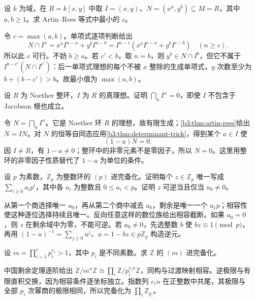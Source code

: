 \begin{exercise}\label{b3:ex:13-artin-rees-number}
	设 \(k\) 为域，在 \(R=k[x,y]\) 中取 \(I=(x,y)\)、\(N=(x^a,y^b)\subseteq M=R\)，其中 \(a,b\ge1\)。求 Artin–Rees 等式中最小的 \(c\)。
\end{exercise}
\begin{solution}
	令 \(c=\max(a,b)\)。单项式逐项判断给出
	\[
		N\cap I^n=x^aI^{n-a}+y^bI^{n-b} =I^{n-c}(x^aI^{c-a}+y^bI^{c-b})\quad(n\ge c).
	\]
	所以此 \(c\) 可行。不妨 \(b\ge a\)。若 \(c'<b\)，取 \(n=b\)，则 \(y^b\in N\cap I^b\)，但它不属于 \(I^{b-c'}(N\cap I^{c'})\)：后一单项式理想的每个不被 \(x\) 整除的生成单项式，\(y\) 次数至少为 \(b+(b-c')>b\)。故最小值为 \(\max(a,b)\)。
\end{solution}

\begin{exercise}\label{b3:ex:13-krull-domain}
	设 \(R\) 为 Noether 整环，\(I\) 为 \(R\) 的真理想。证明 \(\bigcap_nI^n=0\)，即使 \(I\) 不包含于 Jacobson 根也成立。
\end{exercise}
\begin{solution}
	令 \(N=\bigcap_nI^n\)。它是 Noether 环 \(R\) 的理想，故有限生成；\cref{b3:thm:artin-rees}给出 \(N=IN\)。对 \(N\) 的恒等自同态应用\cref{b3:thm:determinant-trick}，得到某个 \(a\in I\) 使
	\[
		(1-a)N=0.
	\]
	因 \(I\ne R\)，有 \(1-a\ne0\)；整环中的非零元素不是零因子，所以 \(N=0\)。这里用整环的非零因子性质替代了 \(1-a\) 为单位的条件。
\end{solution}

\begin{exercise}\label{b3:ex:13-p-adic-digits}
	设 \(p\) 为素数，\(\mathbb Z_p\) 为整数环的 \((p)\) 进完备化。证明每个 \(z\in\mathbb Z_p\) 唯一写成 \(\sum_{i\ge0}a_ip^i\)，其中各 \(a_i\) 为整数且 \(0\le a_i<p\)。证明 \(z\) 可逆当且仅当 \(a_0\ne0\)。
\end{exercise}
\begin{solution}
	从第一个商选择唯一 \(a_0\)，再从第二个商中减去 \(a_0\)，剩余是唯一一个 \(a_1p\)；相容性使这种逐位选择持续且唯一。反向任意这样的数位族给出相容截断。如果 \(a_0=0\)，则 \(z\) 在剩余域中为零，不能可逆。若 \(a_0\ne0\)，先选整数 \(b\) 使 \(bz\equiv1\pmod p\)，再用 \((1-u)^{-1}=\sum_{j\ge0}u^j\)、\(u=1-bz\in p\mathbb Z_p\) 构造逆元。
\end{solution}

\begin{exercise}\label{b3:ex:13-composite-adic}
	设 \(m=\prod_{i=1}^rp_i^{e_i}>1\)，其中 \(p_i\) 是不同素数。求 \(\mathbb Z\) 的 \((m)\) 进完备化。
\end{exercise}
\begin{solution}
	中国剩余定理逐阶给出 \(\mathbb Z/m^n\mathbb Z\cong\prod_i\mathbb Z/p_i^{e_in}\mathbb Z\)，同构与过渡映射相容。逆极限与有限直积交换，因为相容条件逐坐标独立。指数列 \(e_in\) 在正整数中共尾，其极限与全部 \(p_i\) 次幂商的极限相同，所以完备化为 \(\prod_i\mathbb Z_{p_i}\)。
\end{solution}

